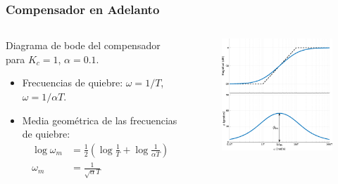 \documentclass[aspectratio=169]{beamer}
\theoremstyle{definition}
\theoremstyle{plain}
\theoremstyle{remark}
\begin{document}
\begin{frame}[<+->]\frametitle{Compensador en Adelanto}
\begin{columns}
	\begin{column}{0.5\textwidth}
	Diagrama de bode del compensador para $K_c=1$, $\alpha=0.1$.
	\begin{itemize}
		\item Frecuencias de quiebre: $\omega = 1/T$, $\omega = 1/\alpha T$.
		\item Media geométrica de las frecuencias de quiebre:
		\begin{align*}
			\log \omega_m &=\frac{1}{2}\left( \log \frac{1}{T} + \log \frac{1}{\alpha T} \right)\\
			\omega_m &= \frac{1}{\sqrt{\alpha}T}
		\end{align*}
	\end{itemize}
	\end{column}
	\begin{column}{0.5\textwidth}
	\begin{figure}
		\centering
		\includegraphics[width=7cm]{images/bodeLeadComp.eps}
	\end{figure}
	\end{column}
\end{columns}
\end{frame}
\end{document}
